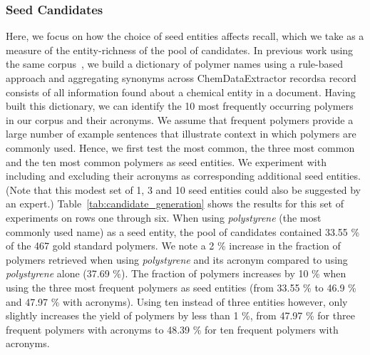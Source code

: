 \subsubsection{Seed Candidates}
Here, we focus on how the choice of seed entities affects recall, which we take as a measure of the entity-richness of the pool of candidates.
In previous work using the same corpus~\cite{tchoua2016hybrid,tchoua2016hybridi}, we build a dictionary of polymer names using a rule-based approach and aggregating synonyms across ChemDataExtractor records\textemdash a record consists of all information found about a chemical entity in a document.  
Having built this dictionary, we can identify the 10 most frequently occurring polymers in our corpus and their acronyms.
We assume that frequent polymers provide a large number of example sentences that illustrate context in which polymers are commonly used.
Hence, we first test the most common, the three most common and the ten most common polymers as seed entities.
We experiment with including and excluding their acronyms as corresponding additional seed entities.
(Note that this modest set of 1, 3 and 10 seed entities could also be suggested by an expert.)
Table~\ref{tab:candidate_generation} shows the results for this set of experiments on rows one through six.
When using \textit{polystyrene} (the most commonly used name) as a seed entity, the pool of candidates contained 33.55 \% of the 467 gold standard polymers.
We note a 2 \% increase in the fraction of polymers retrieved when using \textit{polystyrene} and its acronym compared to using \textit{polystyrene} alone (37.69 \%).
The fraction of polymers increases by 10 \% when using the three most frequent polymers as seed entities (from 33.55 \% to 46.9 \% and 47.97 \% with acronyms). 
Using ten instead of three entities however, only slightly increases the yield of polymers by less than 1 \%, from 47.97 \% for three frequent polymers with acronyms to 48.39 \% for ten frequent polymers with acronyms.


